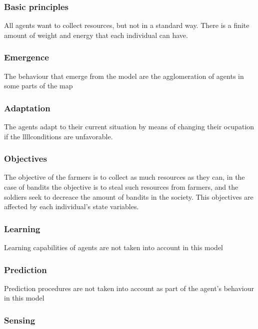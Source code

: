 \documentclass{wscpaperproc}
\theoremstyle{wsc}
\begin{document}
\subsubsection{Basic principles}

All agents want to collect resources, but not in a standard way. There is a
finite amount of weight and energy that each individual can have.

\subsubsection{Emergence}

The behaviour that emerge from the model are the agglomeration of agents in
some parts of the map

\subsubsection{Adaptation}

The agents adapt to their current situation by means of changing their
ocupation if the llllconditions are unfavorable.

\subsubsection{Objectives}

The objective of the farmers is to collect as much resources as they can, in
the case of bandits the objective is to steal such resources from farmers, and
the soldiers seek to decreace the amount of bandits in the society. This
objectives are affected by each individual's state variables.

\subsubsection{Learning}

Learning capabilities of agents are not taken into account in this model

\subsubsection{Prediction}

Prediction procedures are not taken into account as part of the agent's
behaviour in this model

\subsubsection{Sensing}
\end{document}
